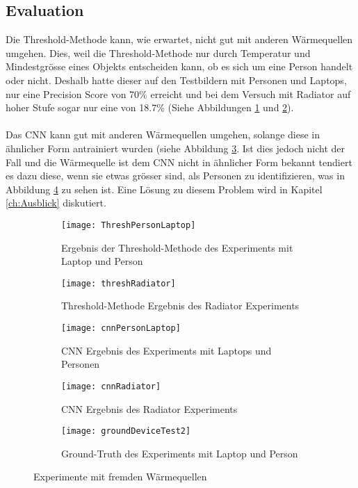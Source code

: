 \subsection{Evaluation}

Die Threshold-Methode kann, wie erwartet, nicht gut mit anderen Wärmequellen umgehen. Dies, weil die Threshold-Methode nur durch Temperatur und Mindestgrösse eines Objekts entscheiden kann, ob es sich um eine Person handelt oder nicht. Deshalb hatte dieser auf den Testbildern mit Personen und Laptops, nur eine Precision Score von 70\% erreicht und bei dem Versuch mit Radiator auf hoher Stufe sogar nur eine von 18.7\% (Siehe Abbildungen  \ref{fig:ThreshPersonLaptop} und \ref{fig:thresholdRadiator}).\\
\\
Das \gls{CNN} kann gut mit anderen Wärmequellen umgehen, solange diese in ähnlicher Form antrainiert wurden (siehe Abbildung \ref{fig:cnnPersonLaptop}. Ist dies jedoch nicht der Fall und die Wärmequelle ist dem \gls{CNN} nicht in ähnlicher Form bekannt tendiert es dazu diese, wenn sie etwas grösser sind, als Personen zu identifizieren, was in Abbildung \ref{fig:cnnRadiator} zu sehen ist. Eine Lösung zu diesem Problem wird in Kapitel \ref{ch:Ausblick} diskutiert. 

\vspace{.5em}
\begin{figure}[htb]
	\centering
	\begin{subfigure}{.45\linewidth}
		\centering
		\texttt{[image: ThreshPersonLaptop]}
		\caption{Ergebnis der Threshold-Methode des Experiments mit Laptop und Person}
		\label{fig:ThreshPersonLaptop}
	\end{subfigure}\hfill%
	\begin{subfigure}{.45\linewidth}
		\centering
		\texttt{[image: threshRadiator]}
		\caption{Threshold-Methode Ergebnis des Radiator Experiments}
		\label{fig:thresholdRadiator}
	\end{subfigure}\hfill%
	\begin{subfigure}{.45\linewidth}
		\centering
		\texttt{[image: cnnPersonLaptop]}
		\caption{CNN Ergebnis des Experiments mit Laptops und Personen}
		\label{fig:cnnPersonLaptop}
	\end{subfigure}\hfill%
	\begin{subfigure}{.45\linewidth}
		\centering
		\texttt{[image: cnnRadiator]}
		\caption{CNN Ergebnis des Radiator Experiments}
		\label{fig:cnnRadiator}
	\end{subfigure}\hfill%
	\begin{subfigure}{.55\linewidth}
		\centering
		\texttt{[image: groundDeviceTest2]}
		\caption{Ground-Truth des Experiments mit Laptop und Person}
		\label{fig:groundPersonLaptop}
	\end{subfigure}
	\caption{Experimente mit fremden Wärmequellen}
	\label{fig:HeatSources}
\end{figure}
\vspace{.5em}



